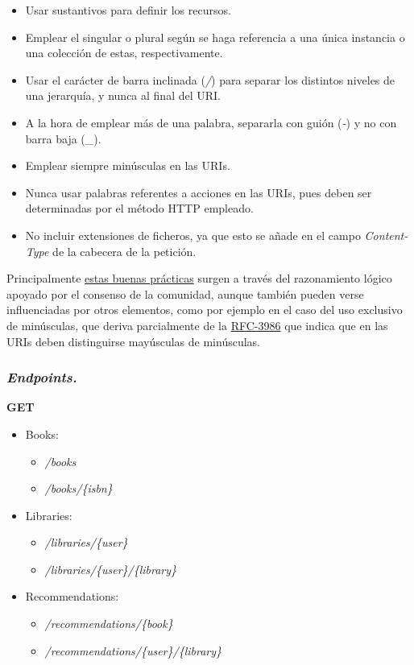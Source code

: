 \begin{itemize}
    \item Usar sustantivos para definir los recursos.
    \item Emplear el singular o plural según se haga referencia a una única instancia o una colección de estas, respectivamente.
    \item Usar el carácter de barra inclinada (\textit{/}) para separar los distintos niveles de una jerarquía, y nunca al final del URI.
    \item A la hora de emplear más de una palabra, separarla con guión (\textit{-}) y no con barra baja (\textit{\_}).
    \item Emplear siempre minúsculas en las URIs.
    \item Nunca usar palabras referentes a acciones en las URIs, pues deben ser determinadas por el método HTTP empleado.
    \item No incluir extensiones de ficheros, ya que esto se añade en el campo \textit{Content-Type} de la cabecera de la petición.
\end{itemize}

Principalmente \href{https://restfulapi.net/resource-naming/}{estas buenas prácticas} surgen a través del razonamiento lógico apoyado por el consenso de la comunidad, aunque también pueden verse influenciadas por otros elementos, como por ejemplo en el caso del uso exclusivo de minúsculas, que deriva parcialmente de la \href{https://www.rfc-editor.org/rfc/rfc3986}{RFC-3986} que indica que en las URIs deben distinguirse mayúsculas de minúsculas.

\subsubsection{\textit{Endpoints.}}

\textbf{GET}
\begin{itemize}
    \item Books:
    \begin{itemize}
        \item \textit{/books}
        \item \textit{/books/\{isbn\}}
    \end{itemize}
    \item Libraries:
    \begin{itemize}
        \item \textit{/libraries/\{user\}}
        \item \textit{/libraries/\{user\}/\{library\}}
    \end{itemize}
    \item Recommendations:
    \begin{itemize}
        \item \textit{/recommendations/\{book\}}
        \item \textit{/recommendations/\{user\}/\{library\}}
    \end{itemize}
\end{itemize}

